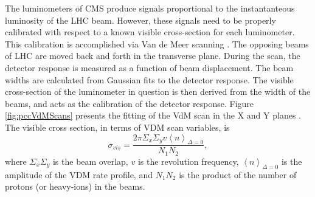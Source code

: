 The luminometers of CMS produce signals proportional to the instantanteous luminosity of the LHC beam. However, these signals need to be properly calibrated with respect to a known visible cross-section for each luminometer. This calibration is accomplished via Van de Meer scanning \cite{vanderMeer:1968zz}. The opposing beams of LHC are moved back and forth in the transverse plane. During the scan, the detector response is measured as a function of beam displacement. The beam widths are calculated from Gaussian fits to the detector response. The visible cross-section of the luminometer in question is then derived from the width of the beams, and acts as the calibration of the detector response. Figure \ref{fig:pccVdMScans} presents the fitting of the VdM scan in the X and Y planes \cite{CMS:2013gfa}. The visible cross section, in terms of VDM scan variables, is 
\begin{equation}
\sigma_{vis} = \frac{2 \pi \Sigma_x \Sigma_y v\left \langle n \right \rangle_{\Delta=0}}{N_1 N_2},
\end{equation}
where $\Sigma_x \Sigma_y$ is the beam overlap, $v$ is the revolution frequency, $\left \langle n \right \rangle_{\Delta=0}$ is the amplitude of the VDM rate profile, and $N_1 N_2$ is the product of the number of protons (or heavy-ions) in the beams.

